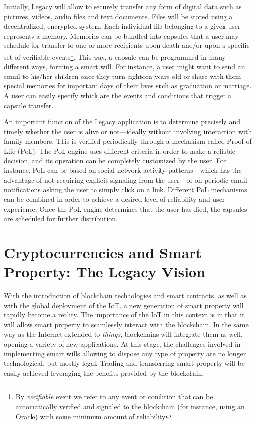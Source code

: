 Initially, Legacy will allow to securely transfer any form of digital data such as pictures, videos, audio files and text documents. Files will be stored using a decentralized, encrypted system. Each individual file belonging to a given user represents a memory. Memories can be bundled into capsules that a user may schedule for transfer to one or more recipients upon death and/or upon a specific set of verifiable events\footnote{By \textit{verifiable} event we refer to any event or condition that can be automatically verified and signaled to the blockchain (for instance, using an Oracle) with some minimum amount of reliability}. This way, a capsule can be programmed in many different ways, forming a smart will. For instance, a user might want to send an email to his/her children once they turn eighteen years old or share with them special memories for important days of their lives such as graduation or marriage. A user can easily specify which are the events and conditions that trigger a capsule transfer.

An important function of the Legacy application is to determine precisely and timely whether the user is alive or not---ideally without involving interaction with family members. This is verified periodically through a mechanism called Proof of Life (PoL). The PoL engine uses different criteria in order to make a reliable decision, and its operation can be completely customized by the user. For instance, PoL can be based on social network activity patterns---which has the advantage of not requiring explicit signaling from the user---or on periodic email notifications asking the user to simply click on a link. Different PoL mechanisms can be combined in order to achieve a desired level of reliability and user experience. Once the PoL engine determines that the user has died, the capsules are scheduled for further distribution.

\section{Cryptocurrencies and Smart Property: The Legacy Vision} %
\label{sec:cryptocurrencies_and_smart_property_the_legacy_vision}

With the introduction of blockchain technologies and smart contracts, as well as with the global deployment of the IoT, a new generation of smart property will rapidly become a reality.
The importance of the IoT in this context is in that it will allow smart property to seamlessly interact with the blockchain. 
In the same way as the Internet extended to \textit{things}, blockchains will integrate them as well, opening a variety of new applications.
At this stage, the challenges involved in implementing smart wills allowing to dispose any type of property are no longer technological, but mostly legal. Trading and transferring smart property will be easily achieved leveraging the benefits provided by the blockchain.%


